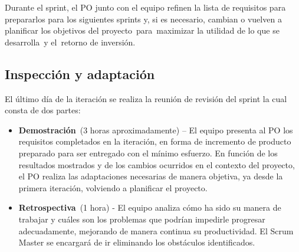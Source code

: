 Durante el sprint, el PO junto con el equipo refinen la lista de requisitos para prepararlos para los siguientes sprints y, si es necesario, cambian o vuelven a planificar los objetivos del proyecto para maximizar la utilidad de lo que se desarrolla y el retorno de inversión.

\subsection{Inspección y adaptación}
El último día de la iteración se realiza la reunión de revisión del sprint la cual consta de dos partes:
\begin{itemize}
    \item \textbf{Demostración} (3 horas aproximadamente) – El equipo presenta al PO los requisitos completados en la iteración, en forma de incremento de producto preparado para ser entregado con el mínimo esfuerzo. En función de los resultados mostrados y de los cambios ocurridos en el contexto del proyecto, el PO realiza las adaptaciones necesarias de manera objetiva, ya desde la primera iteración, volviendo a planificar el proyecto.
    \item \textbf{Retrospectiva} (1 hora) - El equipo analiza cómo ha sido su manera de trabajar y cuáles son los problemas que podrían impedirle progresar adecuadamente, mejorando de manera continua su productividad. El Scrum Master se encargará de ir eliminando los obstáculos identificados.
\end{itemize}